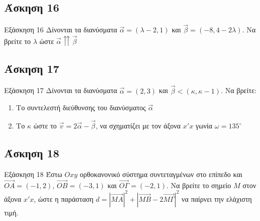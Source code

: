 \documentclass[greek]{beamer}
\begin{document}
\subsection{Άσκηση 16}
\begin{frame}[label=Άσκηση16,t]{Εξάσκηση 16}
      Δίνονται τα διανύσματα $\vec{α}=(λ-2,1)$ και $\vec{β}=(-8,4-2λ)$. Να βρείτε το $λ$ ώστε $\vec{α}\upuparrows \vec{β}$
\end{frame}

\subsection{Άσκηση 17}
\begin{frame}[label=Άσκηση17,t]{Εξάσκηση 17}
      Δίνονται τα διανύσματα $\vec{α}=(2,3)$ και $\vec{β}<(κ,κ-1)$. Να βρείτε:
      \begin{enumerate}
            \item<1-> Το συντελεστή διεύθυνσης του διανύσματος $\vec{α}$
            \item<2-> Το $κ$ ώστε το $\vec{v}=2\vec{α}-\vec{β}$, να σχηματίζει με τον άξονα $x'x$ γωνία $ω=135^{\circ}$
      \end{enumerate}
\end{frame}

\subsection{Άσκηση 18}
\begin{frame}[label=Άσκηση18,t]{Εξάσκηση 18}
      Έστω $Οxy$ ορθοκανονικό σύστημα συντεταγμένων στο επίπεδο και $\overrightarrow{ΟΑ}=(-1,2)$, $\overrightarrow{ΟΒ}=(-3,1)$ και $\overrightarrow{ΟΓ}=(-2,1)$. Να βρείτε το σημείο $Μ$ στον άξονα $x'x$, ώστε η παράσταση $d=|\overrightarrow{ΜΑ}|^2+|\overrightarrow{ΜΒ}-2\overrightarrow{ΜΓ}|^2$ να παίρνει την ελάχιστη τιμή.
\end{frame}
\end{document}
